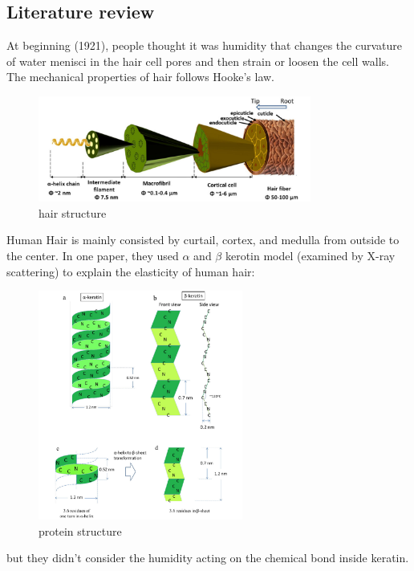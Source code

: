 \documentclass{article}
\begin{document}
\subsection{Literature review}
At beginning (1921), people thought it was humidity that changes the curvature of water menisci in the hair cell pores and then strain or loosen the cell walls. The mechanical properties of hair follows Hooke's law\citep{Whipple_1921}.
\begin{figure}[H]
    \centering
\includegraphics[width=0.8\textwidth]{hair structure.jpg}
    \caption{hair structure\citep{yu2017structure}}
    \label{hair structure}
\end{figure}
Human Hair is mainly consisted by curtail, cortex, and medulla from outside to the center. In one paper, they used $\alpha$ and $\beta$ kerotin model (examined by X-ray scattering) to explain the elasticity of human hair:
\begin{figure}[H]
    \centering
\includegraphics[width=0.6\textwidth]{protein structure.png}
    \caption{protein structure\citep{yu2017structure}}
    \label{protein structure}
\end{figure}
but they didn't consider the humidity acting on the chemical bond inside keratin.
\end{document}
